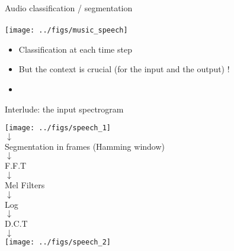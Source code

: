 \begin{frame}{Audio classification / segmentation}
  \framesubtitle{\cite{Jang19Music}}
  \begin{center}
    \texttt{[image: ../figs/music\_speech]}    
  \end{center}
  \begin{itemize}
  \item Classification at each time step
  \item But the context is crucial (for the input and the output) ! 
  \item {}
  \end{itemize}
\end{frame}


\begin{frame}{Interlude: the input spectrogram}
  \begin{center}
    \texttt{[image: ../figs/speech\_1]}\\
    $\downarrow$ \\
    Segmentation in frames (Hamming window)\\
    $\downarrow$ \\
    F.F.T \\
    $\downarrow$ \\
    Mel Filters \\
    $\downarrow$ \\
    Log\\
    $\downarrow$ \\
    D.C.T  \\
    $\downarrow$ \\
    \texttt{[image: ../figs/speech\_2]}\\
  \end{center}
\end{frame}



